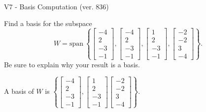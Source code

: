 \begin{exercise}
  \begin{exerciseTitle}V7 - Basis Computation (ver. 836)\end{exerciseTitle}
  \begin{exerciseStatement}
    Find a basis for the subspace 
\[W=\mathrm{span}\ \left\{\left[\begin{array}{r}
-4 \\
2 \\
-3 \\
-1
\end{array}\right] , \left[\begin{array}{r}
-4 \\
2 \\
-3 \\
-1
\end{array}\right] , \left[\begin{array}{r}
1 \\
2 \\
-3 \\
-1
\end{array}\right] , \left[\begin{array}{r}
-2 \\
-2 \\
3 \\
-4
\end{array}\right]\right\}.\]
 Be sure to explain why your result is a basis.


  \end{exerciseStatement}
  \begin{exerciseAnswer}
   A basis of \(W\) is  \(\left\{\left[\begin{array}{r}
-4 \\
2 \\
-3 \\
-1
\end{array}\right] , \left[\begin{array}{r}
1 \\
2 \\
-3 \\
-1
\end{array}\right] \left[\begin{array}{r}
-2 \\
-2 \\
3 \\
-4
\end{array}\right]\right\}\).
  


  \end{exerciseAnswer}
\end{exercise}